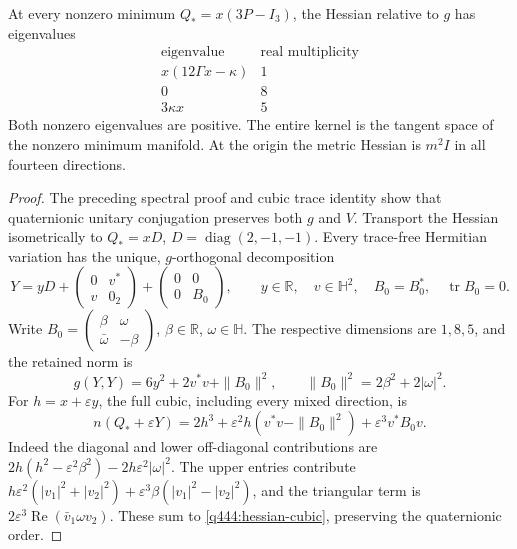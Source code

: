\begin{theorem}\label{q444:vacuum-hessian}
At every nonzero minimum $Q_*=x(3P-I_3)$, the Hessian relative to $g$
has eigenvalues
\[
 \begin{array}{c|c}
 \text{eigenvalue}&\text{real multiplicity}\\\hline
 x(12\Gamma x-\kappa)&1\\
 0&8\\
 3\kappa x&5
 \end{array}
\]
Both nonzero eigenvalues are positive. The entire kernel is the tangent
space of the nonzero minimum manifold. At the origin the metric Hessian
is $m^2I$ in all fourteen directions.
\end{theorem}
\begin{proof}
The preceding spectral proof and cubic trace identity show that
quaternionic unitary conjugation preserves both $g$ and $V$.
Transport the Hessian isometrically to $Q_*=xD$, $D=\operatorname{diag}(2,-1,-1)$.
Every trace-free Hermitian variation has the unique, $g$-orthogonal decomposition
\[
 Y=yD+\begin{pmatrix}0&v^*\\v&0_2\end{pmatrix}
       +\begin{pmatrix}0&0\\0&B_0\end{pmatrix},
 \qquad y\in\mathbb R,\quad v\in\mathbb H^2,
 \quad B_0=B_0^*,\quad\operatorname{tr}B_0=0.
\]
Write $B_0=\left(\begin{smallmatrix}\beta&\omega\\\bar\omega&-\beta\end{smallmatrix}\right)$,
$\beta\in\mathbb R$, $\omega\in\mathbb H$. The respective dimensions are
$1,8,5$, and the retained norm is
\[
 g(Y,Y)=6y^2+2v^*v+\|B_0\|^2,
 \qquad\|B_0\|^2=2\beta^2+2|\omega|^2.
\]
For $h=x+\varepsilon y$, the full cubic, including every mixed direction,
is
\begin{equation}\label{q444:hessian-cubic}
 n(Q_*+\varepsilon Y)
 =2h^3+\varepsilon^2h(v^*v-\|B_0\|^2)
                                      +\varepsilon^3v^*B_0v.
\end{equation}
Indeed the diagonal and lower off-diagonal contributions are
$2h(h^2-\varepsilon^2\beta^2)-2h\varepsilon^2|\omega|^2$.
The upper entries contribute
$h\varepsilon^2(|v_1|^2+|v_2|^2)
+\varepsilon^3\beta(|v_1|^2-|v_2|^2)$, and the triangular term is
$2\varepsilon^3\operatorname{Re}(\bar v_1\omega v_2)$.
These sum to \eqref{q444:hessian-cubic}, preserving the quaternionic order.

\end{proof}
